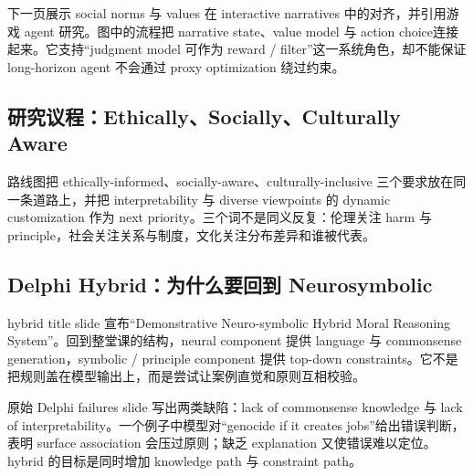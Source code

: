 
下一页展示 social norms 与 values 在 interactive narratives 中的对齐，并引用游戏 agent 研究。图中的流程把 narrative state、value model 与 action choice连接起来。它支持“judgment model 可作为 reward / filter”这一系统角色，却不能保证 long-horizon agent 不会通过 proxy optimization 绕过约束。


\subsection{研究议程：Ethically、Socially、Culturally Aware}

路线图把 ethically-informed、socially-aware、culturally-inclusive 三个要求放在同一条道路上，并把 interpretability 与 diverse viewpoints 的 dynamic customization 作为 next priority。三个词不是同义反复：伦理关注 harm 与 principle，社会关注关系与制度，文化关注分布差异和谁被代表。


\subsection{Delphi Hybrid：为什么要回到 Neurosymbolic}

hybrid title slide 宣布“Demonstrative Neuro-symbolic Hybrid Moral Reasoning System”。回到整堂课的结构，neural component 提供 language 与 commonsense generation，symbolic / principle component 提供 top-down constraints。它不是把规则盖在模型输出上，而是尝试让案例直觉和原则互相校验。


原始 Delphi failures slide 写出两类缺陷：lack of commonsense knowledge 与 lack of interpretability。一个例子中模型对“genocide if it creates jobs”给出错误判断，表明 surface association 会压过原则；缺乏 explanation 又使错误难以定位。hybrid 的目标是同时增加 knowledge path 与 constraint path。

